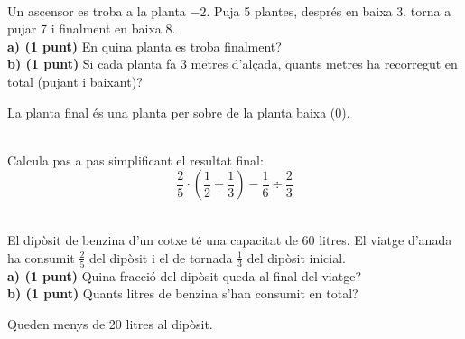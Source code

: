 \documentclass[a4paper, 11pt]{article}
\begin{document}
 \\
Un ascensor es troba a la planta $-2$. Puja 5 plantes, després en baixa 3, torna a pujar 7 i finalment en baixa 8. \\
\noindent\textbf{a) (1 punt)} En quina planta es troba finalment? \\
\vspace{4cm}
\noindent\textbf{b) (1 punt)} Si cada planta fa 3 metres d'alçada, quants metres ha recorregut en total (pujant i baixant)? \\
\vspace{4cm}
\begin{tcolorbox}[colback=blue!5, colframe=blue!30, title=Comprovació de seguretat]
    La planta final és una planta per sobre de la planta baixa (0).
\end{tcolorbox}

\newpage

 \\
Calcula pas a pas simplificant el resultat final:
$$\frac{2}{5} \cdot \left( \frac{1}{2} + \frac{1}{3} \right) - \frac{1}{6} \div \frac{2}{3}$$
\vspace{10cm}

\newpage

 \\
El dipòsit de benzina d'un cotxe té una capacitat de 60 litres. El viatge d'anada ha consumit $\frac{2}{5}$ del dipòsit i el de tornada $\frac{1}{3}$ del dipòsit inicial. \\
\noindent\textbf{a) (1 punt)} Quina fracció del dipòsit queda al final del viatge? \\
\vspace{6cm}
\noindent\textbf{b) (1 punt)} Quants litres de benzina s'han consumit en total? \\
\vspace{6cm}
\begin{tcolorbox}[colback=blue!5, colframe=blue!30, title=Comprovació de seguretat]
    Queden menys de 20 litres al dipòsit.
\end{tcolorbox}
\end{document}
